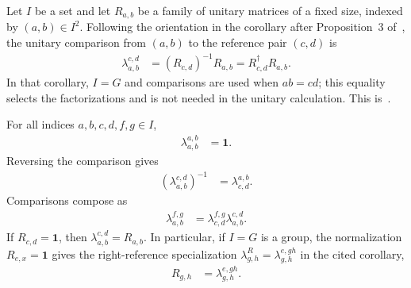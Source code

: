 \begin{definition}
    \label{def:mpug_unitary_factorization_comparison}
    \leanok
    Let $I$ be a set and let $R_{a,b}$ be a family of unitary matrices of a
    fixed size, indexed by $(a,b)\in I^2$. Following the orientation in the
    corollary after Proposition~3
    of~\cite[lines~2782--2821]{FrancoRubio2025MPUGauging}, the unitary
    comparison from $(a,b)$ to the reference pair $(c,d)$ is
    \begin{align}
        \lambda_{a,b}^{c,d}
         & =(R_{c,d})^{-1}R_{a,b}
        =R_{c,d}^\dagger R_{a,b}.
        \label{eq:mpug_unitary_factorization_comparison}
    \end{align}
    In that corollary, $I=G$ and comparisons are used when $ab=cd$; this
    equality selects the factorizations and is not needed in the unitary
    calculation.
    This is~\cite[``Unitary factorization comparison'']{QICLean2026Blueprint}.
\end{definition}

\begin{lemma}
    \label{thm:mpug_unitary_factorization_comparison_laws}
    \leanok
    For all indices $a,b,c,d,f,g\in I$,
    \begin{align}
        \lambda_{a,b}^{a,b} & =\mathbf 1.
    \end{align}
    Reversing the comparison gives
    \begin{align}
        \left(\lambda_{a,b}^{c,d}\right)^{-1}
         & =\lambda_{c,d}^{a,b}.
    \end{align}
    Comparisons compose as
    \begin{align}
        \lambda_{a,b}^{f,g}
         & =\lambda_{c,d}^{f,g}\lambda_{a,b}^{c,d}.
        \label{eq:mpug_unitary_factorization_comparison_laws}
    \end{align}
    If $R_{c,d}=\mathbf 1$, then
    $\lambda_{a,b}^{c,d}=R_{a,b}$. In particular, if $I=G$ is a group, the
    normalization $R_{e,x}=\mathbf 1$ gives the right-reference specialization
    $\lambda^R_{g,h}=\lambda_{g,h}^{e,gh}$ in the cited corollary,
    \begin{align}
        R_{g,h} & =\lambda_{g,h}^{e,gh}.
        \label{eq:mpug_unitary_factorization_right_reference}
    \end{align}
\end{lemma}

